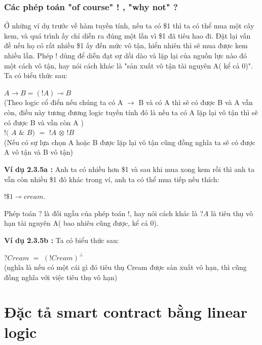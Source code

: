 \documentclass[12pt,a4paper,oneside]{article}
\begin{document}
\subsubsection{Các phép toán "of course" ! , "why not" ?}

Ở những ví dụ trước về hàm tuyến tính, nếu ta có \$1 thì ta có thể mua một cây kem, và quá trình ấy chỉ diễn ra đúng một lần vì \$1 đã tiêu hao đi. Đặt lại vấn đề nếu họ có rất nhiều \$1 ấy đến mức vô tận, hiển nhiên thì sẽ mua được kem nhiều lần. Phép $!$ dùng để diễn đạt sự dồi dào và lặp lại của nguồn lực nào đó một cách vô tận, hay nói cách khác là "sản xuất vô tận tài nguyên A( kể cả 0)". \\

Ta có biểu thức sau:
\begin{center}
	$A \rightarrow B = (!A) \multimap B$ \\
	(Theo logic cổ điển nếu chúng ta có A $\rightarrow$ B và có A thì sẽ có được B và A vẫn còn, điều này tương đương logic tuyến tính đó là nếu ta có A lặp lại vô tận thì sẽ có được B và vẫn còn A )\\
	$!($ $A$ $\&$ $B)$ $=$ $!A$ $\otimes$ $!$$B$\\
	(Nếu có sự lựa chọn A hoặc B được lặp lại vô tận cũng đồng nghĩa ta sẽ có được A vô tận và B vô tận)
\end{center}

\textbf{Ví dụ 2.3.5a :} Anh ta có nhiều hơn \$1 và sau khi mua xong kem rồi thì anh ta vẫn còn nhiều \$1 đô khác trong ví, anh ta có thể mua tiếp nếu thích: 
\begin{center}
	$!\$1 \multimap cream$.
\end{center}


Phép toán $?$ là đối ngẫu của phép toán $!$, hay nói cách khác là $?A$ là tiêu thụ vô hạn tài nguyên A( bao nhiêu cũng được, kể cả 0).


\textbf{ Ví dụ 2.3.5b : }Ta có biểu thức sau:
\begin{center}
	$?Cream$ $=$ $(!Cream)^\bot$ \\
	(nghĩa là nếu có một cái gì đó tiêu thụ Cream được sản xuất vô hạn, thì cũng đồng nghĩa với việc tiêu thụ vô hạn)
\end{center}


\section{Đặc tả smart contract bằng linear logic}
\end{document}

